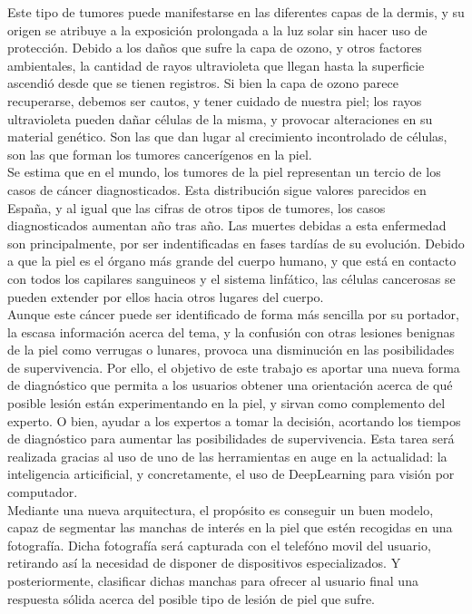 Este tipo de tumores puede manifestarse en las diferentes capas de la dermis, y su origen se atribuye a la exposición prolongada a la luz solar sin hacer uso de protección. Debido a los daños que sufre la capa de ozono, y otros factores ambientales, la cantidad de rayos ultravioleta que llegan hasta la superficie ascendió desde que se tienen registros. Si bien la capa de ozono parece recuperarse, debemos ser cautos, y tener cuidado de nuestra piel; los rayos ultravioleta pueden dañar células de la misma, y provocar alteraciones en su material genético. Son las que dan lugar al crecimiento incontrolado de células, son las que forman los tumores cancerígenos en la piel.\\

Se estima que en el mundo, los tumores de la piel representan un tercio de los casos de cáncer diagnosticados. Esta distribución sigue valores parecidos en España, y al igual que las cifras de otros tipos de tumores, los casos diagnosticados aumentan año tras año. Las muertes debidas a esta enfermedad son principalmente, por ser indentificadas en fases tardías de su evolución. Debido a que la piel es el órgano más grande del cuerpo humano, y que está en contacto con todos los capilares sanguineos y el sistema linfático, las células cancerosas se pueden extender por ellos hacia otros lugares del cuerpo.\\

Aunque este cáncer puede ser identificado de forma más sencilla por su portador, la escasa información acerca del tema, y la confusión con otras lesiones benignas de la piel como verrugas o lunares, provoca una disminución en las posibilidades de supervivencia. Por ello, el objetivo de este trabajo es aportar una nueva forma de diagnóstico que permita a los usuarios obtener una orientación acerca de qué posible lesión están experimentando en la piel, y sirvan como complemento del experto. O bien, ayudar a los expertos a tomar la decisión, acortando los tiempos de diagnóstico para aumentar las posibilidades de supervivencia. Esta tarea será realizada gracias al uso de uno de las herramientas en auge en la actualidad: la inteligencia articificial, y concretamente, el uso de DeepLearning para visión por computador.\\
 
 Mediante una nueva arquitectura, el propósito es conseguir un buen modelo, capaz de segmentar las manchas de interés en la piel que estén recogidas en una fotografía. Dicha fotografía será capturada con el telefóno movil del usuario, retirando así la necesidad de disponer de dispositivos especializados. Y posteriormente, clasificar dichas manchas para ofrecer al usuario final una respuesta sólida acerca del posible tipo de lesión de piel que sufre.\\

